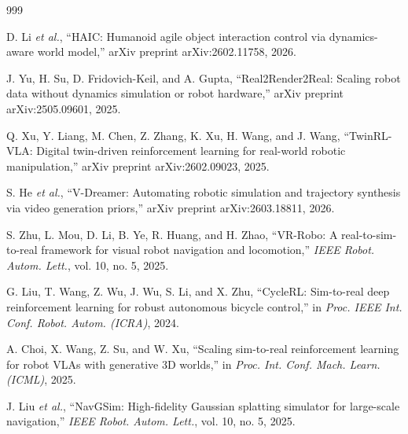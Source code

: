 \documentclass[12pt,a4paper,oneside]{report}
\begin{document}
\begin{thebibliography}{999}

D. Li \textit{et al.}, ``{HAIC}: Humanoid agile object interaction control via dynamics-aware world model,'' arXiv preprint arXiv:2602.11758, 2026.




J. Yu, H. Su, D. Fridovich-Keil, and A. Gupta, ``{Real2Render2Real}: Scaling robot data without dynamics simulation or robot hardware,'' arXiv preprint arXiv:2505.09601, 2025.




Q. Xu, Y. Liang, M. Chen, Z. Zhang, K. Xu, H. Wang, and J. Wang, ``{TwinRL-VLA}: Digital twin-driven reinforcement learning for real-world robotic manipulation,'' arXiv preprint arXiv:2602.09023, 2025.




S. He \textit{et al.}, ``{V-Dreamer}: Automating robotic simulation and trajectory synthesis via video generation priors,'' arXiv preprint arXiv:2603.18811, 2026.




S. Zhu, L. Mou, D. Li, B. Ye, R. Huang, and H. Zhao, ``{VR-Robo}: A real-to-sim-to-real framework for visual robot navigation and locomotion,'' \textit{IEEE Robot. Autom. Lett.}, vol. 10, no. 5, 2025.




G. Liu, T. Wang, Z. Wu, J. Wu, S. Li, and X. Zhu, ``{CycleRL}: Sim-to-real deep reinforcement learning for robust autonomous bicycle control,'' in \textit{Proc. IEEE Int. Conf. Robot. Autom. (ICRA)}, 2024.




A. Choi, X. Wang, Z. Su, and W. Xu, ``Scaling sim-to-real reinforcement learning for robot VLAs with generative 3D worlds,'' in \textit{Proc. Int. Conf. Mach. Learn. (ICML)}, 2025.




J. Liu \textit{et al.}, ``{NavGSim}: High-fidelity Gaussian splatting simulator for large-scale navigation,'' \textit{IEEE Robot. Autom. Lett.}, vol. 10, no. 5, 2025.




\end{thebibliography}
\end{document}
